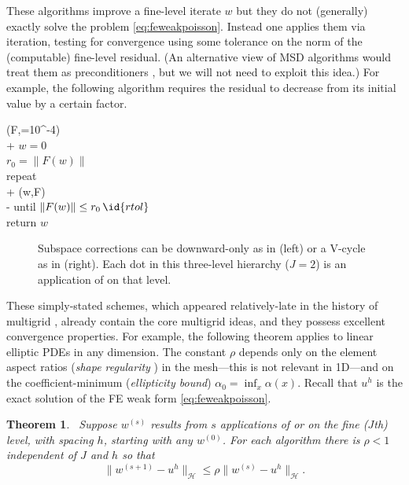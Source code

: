 \documentclass[letterpaper,final,12pt,reqno]{amsart}
\theoremstyle{claim}
\newtheorem{theorem}{Theorem}
\numberwithin{equation}{section}
\numberwithin{figure}{section}
\numberwithin{table}{section}
\numberwithin{theorem}{section}
\begin{document}
These  algorithms improve a fine-level iterate $w$ but they do not (generally) exactly solve the problem \eqref{eq:feweakpoisson}.  Instead one applies them via iteration, testing for convergence using some tolerance on the norm of the (computable) fine-level residual.  (An alternative view of MSD algorithms would treat them as preconditioners \cite[for example]{Bueler2021}, but we will not need to exploit this idea.)  For example, the following algorithm requires the residual to decrease from its initial value by a certain factor.
\begin{pseudo*}
(F,=10^{-4})\text{:} \\+
    $w=0$ \qquad\qquad\qquad\qquad\qquad {} \\
    $r_0 = \|F(w)\|$ \\
    repeat \\+
        (w,F) \qquad\qquad {} \\-
    until $\|F(w)\| \le r_0\, \id{rtol}$ \\
    return $w$
\end{pseudo*}

\begin{figure}

\caption{Subspace corrections can be downward-only as in  (left) or a V-cycle as in  (right).  Each dot in this three-level hierarchy ($J=2$) is an application of  on that level.}
\label{fig:msdcycles}
\end{figure}

These simply-stated schemes, which appeared relatively-late in the history of multigrid \cite{Xu1992}, already contain the core multigrid ideas, and they possess excellent convergence properties.  For example, the following theorem applies to linear elliptic PDEs in any dimension.  The constant $\rho$ depends only on the element aspect ratios (\emph{shape regularity} \cite{Elmanetal2014}) in the mesh---this is not relevant in 1D---and on the coefficient-minimum (\emph{ellipticity bound}) $\alpha_0=\inf_x \alpha(x)$.  Recall that $u^h$ is the exact solution of the FE weak form \eqref{eq:feweakpoisson}.

\begin{theorem} \cite[Thm.~3.10]{GraeserKornhuber2009}\,  \label{thm:msdconvergence}  Suppose $w^{(s)}$  results from $s$ applications of  or  on the fine ($J$th) level, with spacing $h$, starting with any $w^{(0)}$.  For each algorithm there is $\rho<1$ independent of $J$ and $h$ so that
\begin{equation}
  \|w^{(s+1)} - u^h\|_{\mathcal{H}} \le \rho \|w^{(s)} - u^h\|_{\mathcal{H}}.  \label{eq:msdconvergence}
\end{equation}
\end{theorem}
\end{document}
